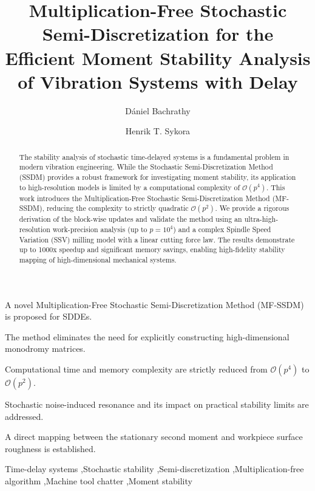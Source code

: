 \documentclass[preprint,12pt]{elsarticle}
\begin{document}
\begin{frontmatter}

\title{Multiplication-Free Stochastic Semi-Discretization for the Efficient Moment Stability Analysis of Vibration Systems with Delay}

\author[1]{D\'aniel Bachrathy}
\author[1]{Henrik T. Sykora}

\address[1]{Department of Applied Mechanics, Faculty of Mechanical Engineering, Budapest University of Technology and Economics, M\H{u}egyetem rkp. 3., H-1111 Budapest, Hungary}


\begin{abstract}
The stability analysis of stochastic time-delayed systems is a fundamental problem in modern vibration engineering. While the Stochastic Semi-Discretization Method (SSDM) provides a robust framework for investigating moment stability, its application to high-resolution models is limited by a computational complexity of $\mathcal{O}(p^4)$. This work introduces the Multiplication-Free Stochastic Semi-Discretization Method (MF-SSDM), reducing the complexity to strictly quadratic $\mathcal{O}(p^2)$. We provide a rigorous derivation of the block-wise updates and validate the method using an ultra-high-resolution work-precision analysis (up to $p=10^4$) and a complex Spindle Speed Variation (SSV) milling model with a linear cutting force law. The results demonstrate up to 1000x speedup and significant memory savings, enabling high-fidelity stability mapping of high-dimensional mechanical systems.
\end{abstract}

\begin{highlights}
\item A novel Multiplication-Free Stochastic Semi-Discretization Method (MF-SSDM) is proposed for SDDEs.
\item The method eliminates the need for explicitly constructing high-dimensional monodromy matrices.
\item Computational time and memory complexity are strictly reduced from $\mathcal{O}(p^4)$ to $\mathcal{O}(p^2)$.
\item Stochastic noise-induced resonance and its impact on practical stability limits are addressed.
\item A direct mapping between the stationary second moment and workpiece surface roughness is established.
\end{highlights}

\begin{keyword}
Time-delay systems \sep Stochastic stability \sep Semi-discretization \sep Multiplication-free algorithm \sep Machine tool chatter \sep Moment stability
\end{keyword}

\end{frontmatter}
\end{document}
